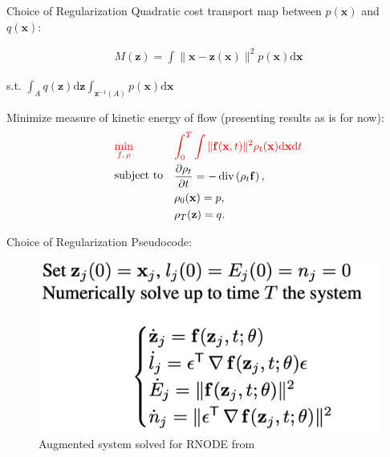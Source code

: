 \documentclass[usenames,dvipsnames]{beamer}
\theoremstyle{definition}
\let\oldcite=\cite
\renewcommand{\cite}[2][]{\textcolor{green}{\oldcite[#1]{#2}}}
\begin{document}
\begin{frame}{Choice of Regularization}
    Quadratic cost transport map between $p(\mathbf{x})$ and $q(\mathbf{x})$:

    $$\begin{aligned}M(\mathbf{z})=\int\|\mathbf{x}-\mathbf{z}(\mathbf{x})\|^2p(\mathbf{x})\mathrm{d}\mathbf{x}\end{aligned}$$

    s.t. $\int_Aq(\mathbf{z})\mathrm{d}\mathbf{z}\int_{\mathbf{z}^{-1}(A)}p(\mathbf{x})\mathrm{d}\mathbf{x}$

    Minimize measure of kinetic energy of flow (presenting results as is for now):
    $$\begin{aligned}
        &\textcolor{red}{\min_{f,\,\rho}}&& \textcolor{red}{\int_0^T\int\|\mathbf{f}(\mathbf{x},t)\|^2\rho_t(\mathbf{x})\mathrm{d}\mathbf{x}\mathrm{d}t}  \\
        &\text{subject to}&& \begin{aligned}\frac{\partial\rho_t}{\partial t}&=-\operatorname{div}\left(\rho_t\mathbf{f}\right),\end{aligned}  \\
        &&&\rho_0(\mathbf{x})=p, \\
        &&&\rho_T(\mathbf{z})=q.
    \end{aligned}$$
\end{frame}

\begin{frame}{Choice of Regularization}
Pseudocode:

\begin{figure}
    \centering
    \includegraphics[width=0.5\linewidth]{finlay_rnode.jpg}
    \caption{Augmented system solved for RNODE from \cite{finlay_how_2020}}
    \label{fig:reg_finlay}
\end{figure}


\end{frame}
\end{document}
